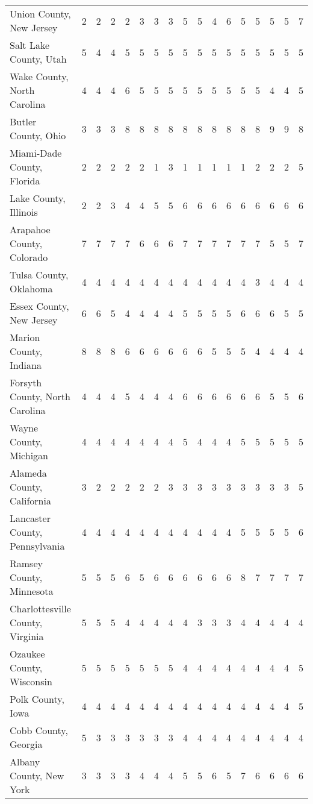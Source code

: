 \begin{landscape}
\begin{longtable}{lcccccccccccccccc}
		Union County, New Jersey & 2 & 2 & 2 & 2 & 3 & 3 & 3 & 5 & 5 & 4 & 6 & 5 & 5 & 5 & 5 & 7 \\
		Salt Lake County, Utah & 5 & 4 & 4 & 5 & 5 & 5 & 5 & 5 & 5 & 5 & 5 & 5 & 5 & 5 & 5 & 5 \\
		Wake County, North Carolina & 4 & 4 & 4 & 6 & 5 & 5 & 5 & 5 & 5 & 5 & 5 & 5 & 5 & 4 & 4 & 5 \\
		Butler County, Ohio & 3 & 3 & 3 & 8 & 8 & 8 & 8 & 8 & 8 & 8 & 8 & 8 & 8 & 9 & 9 & 8 \\
		Miami-Dade County, Florida & 2 & 2 & 2 & 2 & 2 & 1 & 3 & 1 & 1 & 1 & 1 & 1 & 2 & 2 & 2 & 5 \\
		Lake County, Illinois & 2 & 2 & 3 & 4 & 4 & 5 & 5 & 6 & 6 & 6 & 6 & 6 & 6 & 6 & 6 & 6 \\
		Arapahoe County, Colorado & 7 & 7 & 7 & 7 & 6 & 6 & 6 & 7 & 7 & 7 & 7 & 7 & 7 & 5 & 5 & 7 \\
		Tulsa County, Oklahoma & 4 & 4 & 4 & 4 & 4 & 4 & 4 & 4 & 4 & 4 & 4 & 4 & 3 & 4 & 4 & 4 \\
		Essex County, New Jersey & 6 & 6 & 5 & 4 & 4 & 4 & 4 & 5 & 5 & 5 & 5 & 6 & 6 & 6 & 5 & 5 \\
		Marion County, Indiana & 8 & 8 & 8 & 6 & 6 & 6 & 6 & 6 & 6 & 5 & 5 & 5 & 4 & 4 & 4 & 4 \\
		Forsyth County, North Carolina & 4 & 4 & 4 & 5 & 4 & 4 & 4 & 6 & 6 & 6 & 6 & 6 & 6 & 5 & 5 & 6 \\
		Wayne County, Michigan & 4 & 4 & 4 & 4 & 4 & 4 & 4 & 5 & 4 & 4 & 4 & 5 & 5 & 5 & 5 & 5 \\
		Alameda County, California & 3 & 2 & 2 & 2 & 2 & 2 & 3 & 3 & 3 & 3 & 3 & 3 & 3 & 3 & 3 & 5 \\
		Lancaster County, Pennsylvania & 4 & 4 & 4 & 4 & 4 & 4 & 4 & 4 & 4 & 4 & 4 & 5 & 5 & 5 & 5 & 6 \\
		Ramsey County, Minnesota & 5 & 5 & 5 & 6 & 5 & 6 & 6 & 6 & 6 & 6 & 6 & 8 & 7 & 7 & 7 & 7 \\
		Charlottesville County, Virginia & 5 & 5 & 5 & 4 & 4 & 4 & 4 & 4 & 3 & 3 & 3 & 4 & 4 & 4 & 4 & 4 \\
		Ozaukee County, Wisconsin & 5 & 5 & 5 & 5 & 5 & 5 & 5 & 4 & 4 & 4 & 4 & 4 & 4 & 4 & 4 & 5 \\
		Polk County, Iowa & 4 & 4 & 4 & 4 & 4 & 4 & 4 & 4 & 4 & 4 & 4 & 4 & 4 & 4 & 4 & 5 \\
		Cobb County, Georgia & 5 & 3 & 3 & 3 & 3 & 3 & 3 & 4 & 4 & 4 & 4 & 4 & 4 & 4 & 4 & 4 \\
		Albany County, New York & 3 & 3 & 3 & 3 & 4 & 4 & 4 & 5 & 5 & 6 & 5 & 7 & 6 & 6 & 6 & 6 \\

\end{longtable}
\end{landscape}
